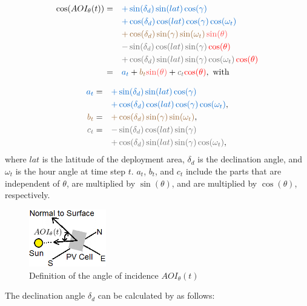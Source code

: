 \begin{align}
\cos(AOI_{\theta}(t))= &\quad \textcolor{SeaBlue}{+ \sin(\delta_d) \sin(lat) \cos(\gamma)} \nonumber \\
					 &\quad \textcolor{SeaBlue}{+ \cos(\delta_d) \cos(lat) \cos(\gamma) \cos(\omega_t)} \nonumber \\
			   	 &\quad \textcolor{Orange8}{+ \cos(\delta_d) \sin(\gamma) \sin(\omega_t)} \!\!\enskip \textcolor{red!70}{ \sin(\theta)} \nonumber \\
					 &\quad \textcolor{Gray7}{- \sin(\delta_d) \cos(lat) \sin(\gamma)} \!\!\enskip \textcolor{red}{ \cos(\theta)} \nonumber \\
					 &\quad \textcolor{Gray7}{+ \cos(\delta_d) \sin(lat) \sin(\gamma) \cos(\omega_t)} \!\!\enskip \textcolor{red}{ \cos(\theta)} \label{allgemein_AOI}\\
					= &\quad \textcolor{SeaBlue}{a_t} +\textcolor{Orange8}{b_t} \textcolor{red!70}{\sin(\theta)} + \textcolor{Gray7}{c_t} \textcolor{red}{\cos(\theta)}, \text{ with}\nonumber 
\end{align}




\begin{align}
\textcolor{SeaBlue}{a_t}=&\quad \textcolor{SeaBlue}{+ \sin(\delta_d) \sin(lat) \cos(\gamma)}\nonumber  \\
					               &\quad \textcolor{SeaBlue}{+ \cos(\delta_d) \cos(lat) \cos(\gamma) \cos(\omega_t)}, \label{a_t}\\
\textcolor{Orange8}{b_t}=&\quad \textcolor{Orange8}{+ \cos(\delta_d) \sin(\gamma) \sin(\omega_t)} \label{b_t},\\
  \textcolor{Gray7}{c_t}=&\quad \textcolor{Gray7}{- \sin(\delta_d) \cos(lat) \sin(\gamma)} \nonumber  \\
					               &\quad \textcolor{Gray7}{+ \cos(\delta_d) \sin(lat) \sin(\gamma) \cos(\omega_t)}, \label{c_t}
\end{align}
where $lat$ is the latitude of the deployment area, $\delta_d$ is the declination angle, and $\omega_t$ is the hour angle at time step $t$. $a_t$, $b_t$, and $c_t$ include the parts that are independent of $\theta$, are multiplied by $\sin(\theta)$, and are multiplied by $\cos(\theta)$, respectively.
\begin{figure} [H]
	\centering
		\includegraphics[width=0.3\textwidth]{pictures/AOI2}
		\caption{Definition of the angle of incidence $AOI_{\theta}(t)$\label{AOI}}
\end{figure}
The declination angle $\delta_d$ can be calculated by \cite{Solar_Cell_declination} as follows:


